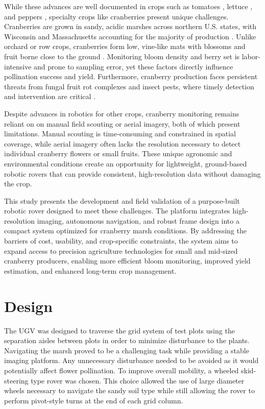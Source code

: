 While these advances are well documented in crops such as tomatoes \cite{seo_development_2021}, lettuce \cite{hu_lettucetrack_2022}, and peppers \cite{lehnert_autonomous_2017}, specialty crops like cranberries present unique challenges. Cranberries are grown in sandy, acidic marshes across northern U.S. states, with Wisconsin and Massachusetts accounting for the majority of production \cite{usda-nass_cranberries_2024}. Unlike orchard or row crops, cranberries form low, vine-like mats with blossoms and fruit borne close to the ground \cite{sandler_cranberry_2008}. Monitoring bloom density and berry set is labor-intensive and prone to sampling error, yet these factors directly influence pollination success and yield. Furthermore, cranberry production faces persistent threats from fungal fruit rot complexes and insect pests, where timely detection and intervention are critical \cite{oudemans_cranberry_1998}.

Despite advances in robotics for other crops, cranberry monitoring remains reliant on on manual field scouting or aerial imagery, both of which present limitations. Manual scouting is time-consuming and constrained in spatial coverage, while aerial imagery often lacks the resolution necessary to detect individual cranberry flowers or small fruits. These unique agronomic and environmental conditions create an opportunity for lightweight, ground-based robotic rovers that can provide consistent, high-resolution data without damaging the crop.

This study presents the development and field validation of a purpose-built robotic rover designed to meet these challenges. The platform integrates high-resolution imaging, autonomous navigation, and robust frame design into a compact system optimized for cranberry marsh conditions. By addressing the barriers of cost, usability, and crop-specific constraints, the system aims to expand access to precision agriculture technologies for small and mid-sized cranberry producers, enabling more efficient bloom monitoring, improved yield estimation, and enhanced long-term crop management.


\section{Design}

The UGV was designed to traverse the grid system of test plots using the separation aisles between plots in order to minimize disturbance to the plants. Navigating the marsh proved to be a challenging task while providing a stable imaging platform. Any unnecessary disturbance needed to be avoided as it would potentially affect flower pollination. To improve overall mobility, a wheeled skid-steering type rover was chosen. This choice allowed the use of large diameter wheels necessary to navigate the sandy soil type while still allowing the rover to perform pivot-style turns at the end of each grid column.

